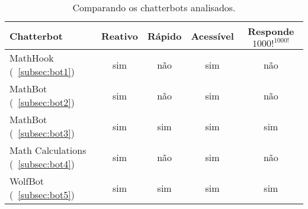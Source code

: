 \begin{table}[h!tbp]
  \centering
    \begin{tabular}{|l|c|c|c|c|}
    \toprule
    \rowcolor[rgb]{ .816,  .808,  .808} \textbf{Chatterbot} & \textbf{Reativo} & \textbf{Rápido} & \textbf{Acessível} & \textbf{Responde $1000!^{1000!}$} \\
    \midrule
    MathHook (~\ref{subsec:bot1})          & sim & não & sim & não \\
    \midrule
    MathBot (~\ref{subsec:bot2})           & sim & não & sim & não \\
    \midrule
    MathBot (~\ref{subsec:bot3})           & sim & sim & sim & sim \\
    \midrule
    Math Calculations (~\ref{subsec:bot4}) & sim & não & sim & não \\
    \midrule
    WolfBot (~\ref{subsec:bot5})           & sim & sim & sim & sim \\
    \bottomrule
    \end{tabular}%
  \caption{Comparando os chatterbots analisados.}
  \label{tab:comparacao}%
\end{table}%